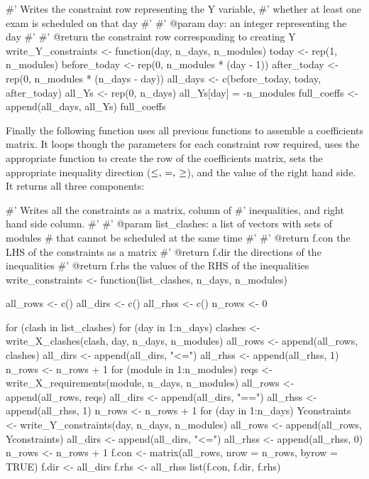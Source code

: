 \begin{Rin-no-test}
#' Writes the constraint row representing the Y variable,
#' whether at least one exam is scheduled on that day
#'
#' @param day: an integer representing the day
#'
#' @return the constraint row corresponding to creating Y
write_Y_constraints <- function(day, n_days, n_modules){
  today <- rep(1, n_modules)
  before_today <- rep(0, n_modules * (day - 1))
  after_today <- rep(0, n_modules * (n_days - day))
  all_days <- c(before_today, today, after_today)
  all_Ys <- rep(0, n_days)
  all_Ys[day] = -n_modules
  full_coeffs <- append(all_days, all_Ys)
  full_coeffs
}
\end{Rin-no-test}

Finally the following function uses all previous functions
to assemble a coefficients matrix.
It loops though the parameters for each constraint row required, uses the
appropriate function to create the row of the coefficients matrix, sets the
appropriate inequality direction (\(\leq$, $=$, $\geq\)), and the value of the
right hand side.
It returns all three components:

\begin{Rin-no-test}
#' Writes all the constraints as a matrix, column of
#' inequalities, and right hand side column.
#'
#' @param list_clashes: a list of vectors with sets of modules
#         that cannot be scheduled at the same time
#'
#' @return f.con the LHS of the constraints as a matrix
#' @return f.dir the directions of the inequalities
#' @return f.rhs the values of the RHS of the inequalities
write_constraints <- function(list_clashes, n_days, n_modules){
  all_rows <- c()
  all_dirs <- c()
  all_rhss <- c()
  n_rows <- 0

  for (clash in list_clashes){
    for (day in 1:n_days){
      clashes <- write_X_clashes(clash, day, n_days, n_modules)
      all_rows <- append(all_rows, clashes)
      all_dirs <- append(all_dirs, "<=")
      all_rhss <- append(all_rhss, 1)
      n_rows <- n_rows + 1
    }
  }
  for (module in 1:n_modules){
    reqs <- write_X_requirements(module, n_days, n_modules)
    all_rows <- append(all_rows, reqs)
    all_dirs <- append(all_dirs, "==")
    all_rhss <- append(all_rhss, 1)
    n_rows <- n_rows + 1
  }
  for (day in 1:n_days){
    Yconstraints <- write_Y_constraints(day, n_days, n_modules)
    all_rows <- append(all_rows, Yconstraints)
    all_dirs <- append(all_dirs, "<=")
    all_rhss <- append(all_rhss, 0)
    n_rows <- n_rows + 1
  }
  f.con <- matrix(all_rows, nrow = n_rows, byrow = TRUE)
  f.dir <- all_dirs
  f.rhs <- all_rhss
  list(f.con, f.dir, f.rhs)
}
\end{Rin-no-test}

